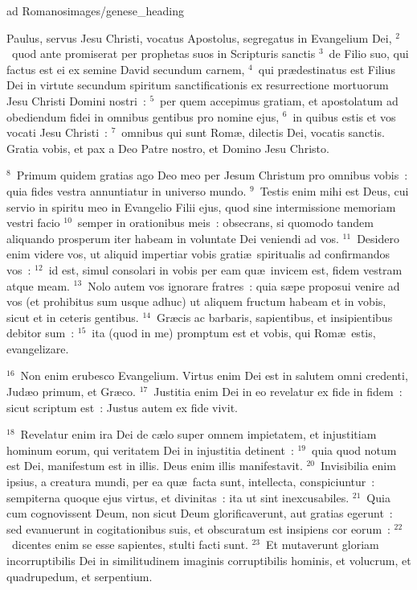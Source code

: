 {ad Romanos}{images/genese_heading}


\lettrine[lines=10,image=true,loversize=0.05,lraise=-0.03]{P}{}aulus, servus Jesu Christi, vocatus Apostolus, segregatus in Evangelium Dei,
${}^{2}$~quod ante promiserat per prophetas suos in Scripturis sanctis
${}^{3}$~de Filio suo, qui factus est ei ex semine David secundum carnem,
${}^{4}$~qui pr\ae destinatus est Filius Dei in virtute secundum spiritum sanctificationis ex resurrectione mortuorum Jesu Christi Domini nostri~:
${}^{5}$~per quem accepimus gratiam, et apostolatum ad obediendum fidei in omnibus gentibus pro nomine ejus,
${}^{6}$~in quibus estis et vos vocati Jesu Christi~:
${}^{7}$~omnibus qui sunt Rom\ae , dilectis Dei, vocatis sanctis. Gratia vobis, et pax a Deo Patre nostro, et Domino Jesu Christo.


${}^{8}$~Primum quidem gratias ago Deo meo per Jesum Christum pro omnibus vobis~: quia fides vestra annuntiatur in universo mundo.
${}^{9}$~Testis enim mihi est Deus, cui servio in spiritu meo in Evangelio Filii ejus, quod sine intermissione memoriam vestri facio
${}^{10}$~semper in orationibus meis~: obsecrans, si quomodo tandem aliquando prosperum iter habeam in voluntate Dei veniendi ad vos.
${}^{11}$~Desidero enim videre vos, ut aliquid impertiar vobis grati\ae\ spiritualis ad confirmandos vos~:
${}^{12}$~id est, simul consolari in vobis per eam qu\ae\ invicem est, fidem vestram atque meam.
${}^{13}$~Nolo autem vos ignorare fratres~: quia s\ae pe proposui venire ad vos (et prohibitus sum usque adhuc) ut aliquem fructum habeam et in vobis, sicut et in ceteris gentibus.
${}^{14}$~Gr\ae cis ac barbaris, sapientibus, et insipientibus debitor sum~:
${}^{15}$~ita (quod in me) promptum est et vobis, qui Rom\ae\ estis, evangelizare.


${}^{16}$~Non enim erubesco Evangelium. Virtus enim Dei est in salutem omni credenti, Jud\ae o primum, et Gr\ae co.
${}^{17}$~Justitia enim Dei in eo revelatur ex fide in fidem~: sicut scriptum est~: Justus autem ex fide vivit.


${}^{18}$~Revelatur enim ira Dei de c\ae lo super omnem impietatem, et injustitiam hominum eorum, qui veritatem Dei in injustitia detinent~:
${}^{19}$~quia quod notum est Dei, manifestum est in illis. Deus enim illis manifestavit.
${}^{20}$~Invisibilia enim ipsius, a creatura mundi, per ea qu\ae\ facta sunt, intellecta, conspiciuntur~: sempiterna quoque ejus virtus, et divinitas~: ita ut sint inexcusabiles.
${}^{21}$~Quia cum cognovissent Deum, non sicut Deum glorificaverunt, aut gratias egerunt~: sed evanuerunt in cogitationibus suis, et obscuratum est insipiens cor eorum~:
${}^{22}$~dicentes enim se esse sapientes, stulti facti sunt.
${}^{23}$~Et mutaverunt gloriam incorruptibilis Dei in similitudinem imaginis corruptibilis hominis, et volucrum, et quadrupedum, et serpentium.


